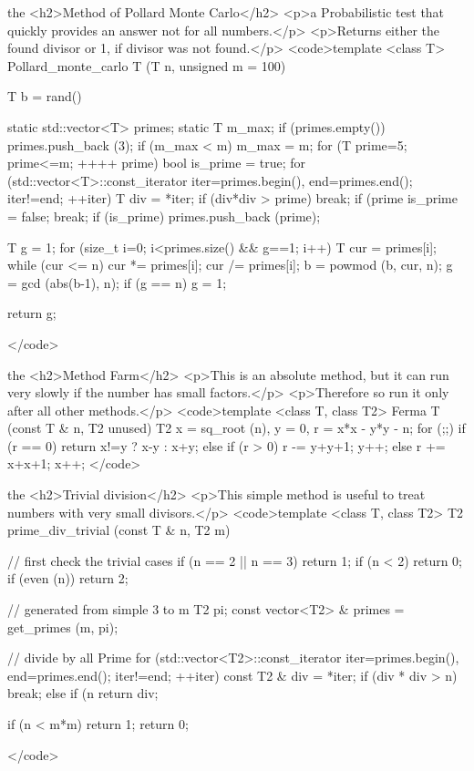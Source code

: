 the <h2>Method of Pollard Monte Carlo</h2>
<p>a Probabilistic test that quickly provides an answer not for all numbers.</p>
<p>Returns either the found divisor or 1, if divisor was not found.</p>
<code>template <class T>
Pollard_monte_carlo T (T n, unsigned m = 100)
{
T b = rand() %

static std::vector<T> primes;
static T m_max;
if (primes.empty())
primes.push_back (3);
if (m_max < m)
{
m_max = m;
for (T prime=5; prime<=m; ++++ prime)
{
bool is_prime = true;
for (std::vector<T>::const_iterator iter=primes.begin(), end=primes.end();
iter!=end; ++iter)
{
T div = *iter;
if (div*div > prime)
break;
if (prime %
{
is_prime = false;
break;
}
}
if (is_prime)
primes.push_back (prime);
}
}

T g = 1;
for (size_t i=0; i<primes.size() && g==1; i++)
{
T cur = primes[i];
while (cur <= n)
cur *= primes[i];
cur /= primes[i];
b = powmod (b, cur, n);
g = gcd (abs(b-1), n);
if (g == n)
g = 1;
}

return g;
}</code>

the <h2>Method Farm</h2>
<p>This is an absolute method, but it can run very slowly if the number has small factors.</p>
<p>Therefore so run it only after all other methods.</p>
<code>template <class T, class T2>
Ferma T (const T & n, T2 unused)
{
T2
x = sq_root (n),
y = 0,
r = x*x - y*y - n;
for (;;)
if (r == 0)
return x!=y ? x-y : x+y;
else
if (r > 0)
{
r -= y+y+1;
y++;
}
else
{
r += x+x+1;
x++;
}
}</code>

the <h2>Trivial division</h2>
<p>This simple method is useful to treat numbers with very small divisors.</p>
<code>template <class T, class T2>
T2 prime_div_trivial (const T & n, T2 m)
{

// first check the trivial cases
if (n == 2 || n == 3)
return 1;
if (n < 2)
return 0;
if (even (n))
return 2;

// generated from simple 3 to m
T2 pi;
const vector<T2> & primes = get_primes (m, pi);

// divide by all Prime
for (std::vector<T2>::const_iterator iter=primes.begin(), end=primes.end();
iter!=end; ++iter)
{
const T2 & div = *iter;
if (div * div > n)
break;
else
if (n %
return div;
}

if (n < m*m)
return 1;
return 0;

}</code>

